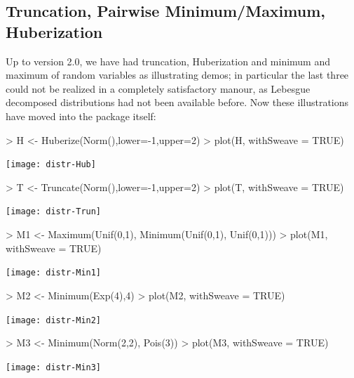 \documentclass[11pt]{article}
\begin{document}
\subsection{Truncation, Pairwise Minimum/Maximum, Huberization}\label{TruncMin}
%
Up to version 2.0, we have had truncation, Huberization and minimum
and maximum of random variables as illustrating demos; in particular
the last three could not be realized in a completely satisfactory manour,
as Lebesgue decomposed distributions had not been available before.
Now these illustrations have moved into the package itself:
\begin{Schunk}
\begin{Sinput}
> H <- Huberize(Norm(),lower=-1,upper=2)
> plot(H, withSweave = TRUE)
\end{Sinput}
\end{Schunk}
\texttt{[image: distr-Hub]}
\begin{Schunk}
\begin{Sinput}
> T <- Truncate(Norm(),lower=-1,upper=2)
> plot(T, withSweave = TRUE)
\end{Sinput}
\end{Schunk}
\texttt{[image: distr-Trun]}
\begin{Schunk}
\begin{Sinput}
> M1 <- Maximum(Unif(0,1), Minimum(Unif(0,1), Unif(0,1)))
> plot(M1, withSweave = TRUE)
\end{Sinput}
\end{Schunk}
\texttt{[image: distr-Min1]}
\begin{Schunk}
\begin{Sinput}
> M2 <- Minimum(Exp(4),4)
> plot(M2, withSweave = TRUE)
\end{Sinput}
\end{Schunk}
\texttt{[image: distr-Min2]}
\begin{Schunk}
\begin{Sinput}
> M3 <- Minimum(Norm(2,2), Pois(3))
> plot(M3, withSweave = TRUE)
\end{Sinput}
\end{Schunk}
\texttt{[image: distr-Min3]}
%
\end{document}
